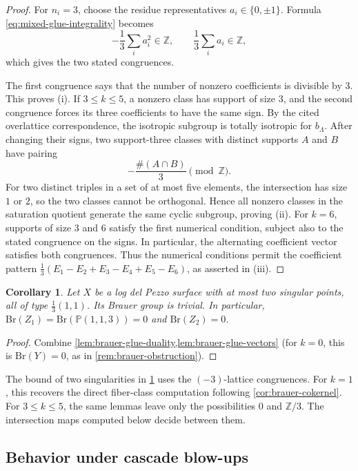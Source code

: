 \documentclass[11pt]{article}
\theoremstyle{plain}
\newtheorem{corollary}[corollary]{Corollary}
\theoremstyle{definition}
\theoremstyle{remark}
\newcommand{\Pp}{\mathbb P}
\newcommand{\Z}{\mathbb Z}
\newcommand{\Br}{\mathrm{Br}}
\begin{document}
\begin{proof}
For \(n_i=3\), choose the residue representatives
\(a_i\in\{0,\pm1\}\). Formula \eqref{eq:mixed-glue-integrality}
becomes
\[
-\frac13\sum_i a_i^2\in\Z,
\qquad \frac13\sum_i a_i\in\Z,
\]
which gives the two stated congruences.

The first congruence says that the number of nonzero coefficients is divisible
by \(3\). This proves (i). If \(3\leq k\leq5\), a nonzero class has support
of size \(3\), and the second congruence forces its three coefficients to
have the same sign. By the cited overlattice correspondence, the isotropic subgroup
is totally isotropic for \(b_\Lambda\). After changing their signs,
two support-three classes with distinct supports \(A\) and \(B\)
have pairing
\[
-\frac{\#(A\cap B)}{3}\pmod{\Z}.
\]
For two distinct triples in a set of at most five elements, the intersection
has size \(1\) or \(2\), so the two classes cannot be orthogonal. Hence all
nonzero classes in the saturation quotient generate the same cyclic subgroup, proving (ii). For
\(k=6\), supports of size \(3\) and \(6\) satisfy the first numerical
condition, subject also to the stated congruence on the signs. In particular,
the alternating coefficient vector satisfies both congruences.
Thus the numerical conditions permit the coefficient pattern
\(\frac13(E_1-E_2+E_3-E_4+E_5-E_6)\), as asserted in (iii).
\end{proof}

\begin{corollary}\label{cor:brauer-one-two}
Let \(X\) be a log del Pezzo surface with at most two singular points,
all of type \(\frac13(1,1)\). Its Brauer group is trivial. In particular,
\(\Br(Z_1)=\Br(\Pp(1,1,3))=0\) and \(\Br(Z_2)=0\).
\end{corollary}

\begin{proof}
Combine \cref{lem:brauer-glue-duality,lem:brauer-glue-vectors}
(for \(k=0\), this is \(\Br(Y)=0\), as in
\cref{rem:brauer-obstruction}).
\end{proof}

The bound of two singularities in \cref{cor:brauer-one-two} uses the
\((-3)\)-lattice congruences. For \(k=1\), this recovers the direct
fiber-class computation following \cref{cor:brauer-cokernel}. For
\(3\leq k\leq5\), the same lemmas
leave only the possibilities \(0\) and \(\Z/3\). The intersection maps
computed below decide between them.

\subsection{Behavior under cascade blow-ups}
\label{app:brauer-invariance}
\end{document}
